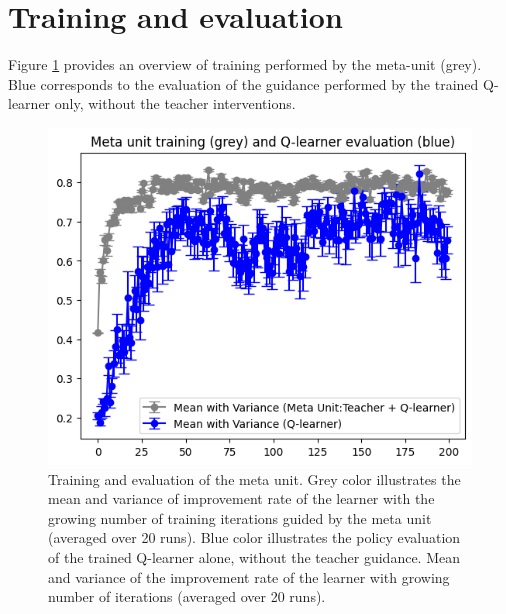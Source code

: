 \documentclass{article}
\begin{document}
\newpage 
\appendix
\section{Training and evaluation}
Figure \ref{fig:my_label} provides an overview of training performed by the meta-unit (grey).
Blue corresponds to the evaluation of the guidance performed by the trained Q-learner only, without the teacher interventions.

\begin{figure}[ht]
    \centering
    \includegraphics[width=.95\linewidth]{figures/meta-unit-mean.png}
       \caption{Training and evaluation of the meta unit. Grey color illustrates the mean and variance of improvement rate of the learner with the growing number of training iterations guided by the meta unit (averaged over 20 runs).  Blue color illustrates the policy evaluation of the trained Q-learner alone, without the teacher guidance. Mean and variance of the improvement rate of the learner with growing number of iterations  (averaged over 20 runs).  }
    \label{fig:my_label}
\end{figure}
\newpage
\end{document}
